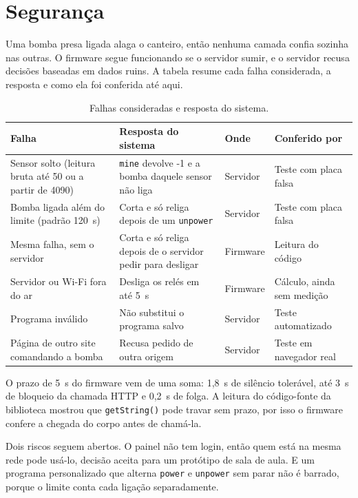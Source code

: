 \documentclass[11pt,a4paper]{article}
\newcommand{\cod}[1]{\texttt{#1}}
\begin{document}
\section{Segurança}\label{sec:seguranca}

Uma bomba presa ligada alaga o canteiro, então nenhuma camada confia sozinha nas outras. O firmware segue funcionando se o servidor sumir, e o servidor recusa decisões baseadas em dados ruins. A tabela resume cada falha considerada, a resposta e como ela foi conferida até aqui.

\begin{table}[htbp]
\centering
\small
\caption{Falhas consideradas e resposta do sistema.}
\label{tab:seguranca}
\begin{tabularx}{\textwidth}{>{\raggedright\arraybackslash}p{4.3cm} Y >{\raggedright\arraybackslash}p{1.5cm} >{\raggedright\arraybackslash}p{2.6cm}}
\toprule
\textbf{Falha} & \textbf{Resposta do sistema} & \textbf{Onde} & \textbf{Conferido por} \\
\midrule
Sensor solto (leitura bruta até 50 ou a partir de 4090) & \cod{mine} devolve -1 e a bomba daquele sensor não liga & Servidor & Teste com placa falsa \\
Bomba ligada além do limite (padrão 120~s) & Corta e só religa depois de um \cod{unpower} & Servidor & Teste com placa falsa \\
Mesma falha, sem o servidor & Corta e só religa depois de o servidor pedir para desligar & Firmware & Leitura do código \\
Servidor ou Wi-Fi fora do ar & Desliga os relés em até 5~s & Firmware & Cálculo, ainda sem medição \\
Programa inválido & Não substitui o programa salvo & Servidor & Teste automatizado \\
Página de outro site comandando a bomba & Recusa pedido de outra origem & Servidor & Teste em navegador real \\
\bottomrule
\end{tabularx}
\end{table}

O prazo de 5~s do firmware vem de uma soma: 1,8~s de silêncio tolerável, até 3~s de bloqueio da chamada HTTP e 0,2~s de folga. A leitura do código-fonte da biblioteca mostrou que \cod{getString()} pode travar sem prazo, por isso o firmware confere a chegada do corpo antes de chamá-la.

Dois riscos seguem abertos. O painel não tem login, então quem está na mesma rede pode usá-lo, decisão aceita para um protótipo de sala de aula. E um programa personalizado que alterna \cod{power} e \cod{unpower} sem parar não é barrado, porque o limite conta cada ligação separadamente.
\end{document}
